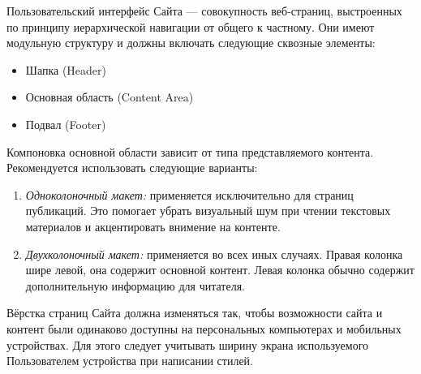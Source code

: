 
Пользовательский интерфейс Сайта --- совокупность веб-страниц, выстроенных по принципу иерархической навигации от общего к частному. Они имеют модульную структуру и должны включать следующие сквозные элементы:

\begin{itemize}
  \item Шапка (Header)
  \item Основная область (Content Area)  
  \item Подвал (Footer)
\end{itemize}

Компоновка основной области зависит от типа представляемого контента. Рекомендуется использовать следующие варианты:

\begin{enumerate}
  \item \textit{Одноколоночный макет:} применяется исключительно для страниц публикаций. Это помогает убрать визуальный шум при чтении текстовых материалов и акцентировать внимение на контенте.
  \item \textit{Двухколоночный макет:} применяется во всех иных случаях. Правая колонка шире левой, она содержит основной контент. Левая колонка обычно содержит дополнительную информацию для читателя.
\end{enumerate}

Вёрстка страниц Сайта должна изменяться так, чтобы возможности сайта и контент были одинаково доступны на персональных компьютерах и мобильных устройствах. Для этого следует учитывать ширину экрана используемого Пользователем устройства при написании стилей.